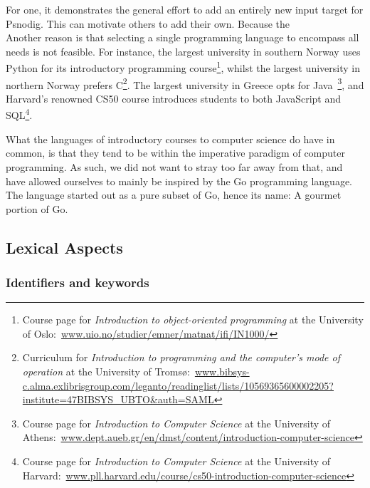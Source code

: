 For one, it demonstrates the general effort to add an entirely new input target for Psnodig. This can motivate others to add their own. Because the  \hfill \\

Another reason is that selecting a single programming language to encompass all needs is not feasible. For instance, the largest university in southern Norway uses Python for its introductory programming course\footnote{Course page for \textit{Introduction to object-oriented programming} at the University of Oslo:~\url{www.uio.no/studier/emner/matnat/ifi/IN1000/}}, whilst the largest university in northern Norway prefers C\footnote{Curriculum for \textit{Introduction to programming and the computer's mode of operation} at the University of Tromsø:~\url{www.bibsys-c.alma.exlibrisgroup.com/leganto/readinglist/lists/10569365600002205?institute=47BIBSYS_UBTO&auth=SAML}}. The largest university in Greece opts for Java~\footnote{Course page for \textit{Introduction to Computer Science} at the University of Athens:~\url{www.dept.aueb.gr/en/dmst/content/introduction-computer-science}}, and Harvard's renowned CS50 course introduces students to both JavaScript and SQL\footnote{Course page for \textit{Introduction to Computer Science} at the University of Harvard:~\url{www.pll.harvard.edu/course/cs50-introduction-computer-science}}. \hfill \\


What the languages of introductory courses to computer science do have in common, is that they tend to be within the imperative paradigm of computer programming. As such, we did not want to stray too far away from that, and have allowed ourselves to mainly be inspired by the Go programming language. The language started out as a pure subset of Go, hence its name: A gourmet portion of Go.

\subsection{Lexical Aspects}

\subsubsection{Identifiers and keywords}

